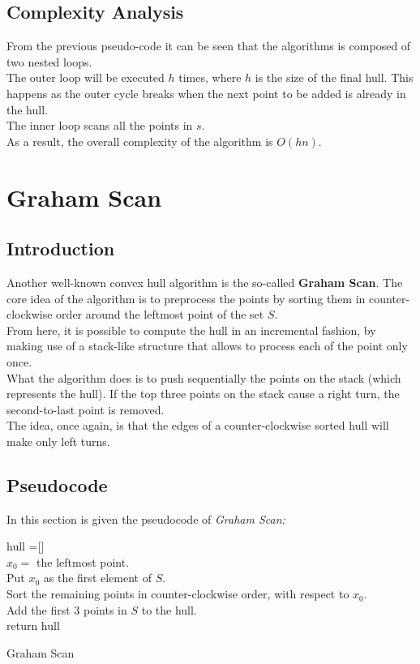 \documentclass[
12pt,
a4paper,
oneside,
headinclude,
footinclude]{report}
\theoremstyle{definition} %
\begin{document}
\subsection{Complexity Analysis}
From the previous pseudo-code it can be seen that the algorithms is composed of two nested loops.\\
The outer loop will be executed $h$ times, where $h$ is the size of the final hull. This happens as the outer cycle breaks when the next point to be added is already in the hull.\\
The inner loop scans all the points in $s$.\\
As a result, the overall complexity of the algorithm is $O(hn)$.


\newpage
\section{Graham Scan}
\subsection{Introduction}
Another well-known convex hull algorithm is the so-called \textbf{Graham Scan}.
The core idea of the algorithm is to preprocess the points by sorting them in counter-clockwise order around the leftmost point of the set $S$. \\
From here, it is possible to compute the hull in an incremental fashion, by making use of a stack-like structure that allows to process each of the point only once.\\

What the algorithm does is to push sequentially the points on the stack (which represents the hull). If the top three points on the stack cause a right turn, the second-to-last point is removed. \\
The idea, once again, is that the edges of a counter-clockwise sorted hull will make only left turns.
\subsection{Pseudocode}
In this section is given the pseudocode of \textit{Graham Scan:} \cite{Preparata:1985:CGI:4333}\\


\begin{algorithm}[H]
	\DontPrintSemicolon
	\SetAlgoVlined
	hull =[]\\
	$x_0 =$ the leftmost point.\\
	Put $x_0$ as the first element of $S$.\\
	Sort the remaining points in counter-clockwise order, with respect to $x_0$.\\
	Add the first 3 points in $S$ to the hull. \\
	
	
	return hull
	\caption{Graham Scan}
\end{algorithm}
\end{document}
